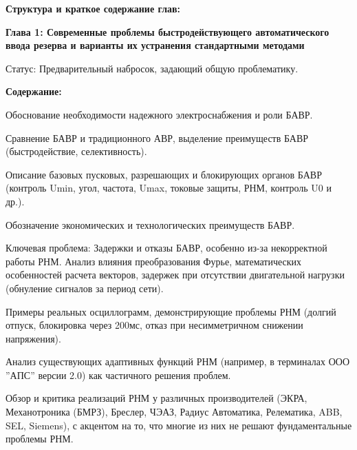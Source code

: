 \par\vspace{0.3cm}
\noindent\textbf{Структура и краткое содержание глав:}\par\vspace{0.2cm}
\noindent\textbf{Глава 1: Современные проблемы быстродействующего автоматического ввода резерва и варианты их устранения стандартными методами}\par\vspace{0.2cm}
Статус: Предварительный набросок, задающий общую проблематику.\par\vspace{0.2cm}
\noindent\textbf{Содержание:}\par\vspace{0.2cm}
Обоснование необходимости надежного электроснабжения и роли БАВР.\par\vspace{0.2cm}
Сравнение БАВР и традиционного АВР, выделение преимуществ БАВР (быстродействие, селективность).\par\vspace{0.2cm}
Описание базовых пусковых, разрешающих и блокирующих органов БАВР (контроль Umin, угол, частота, Umax, токовые защиты, РНМ, контроль U0 и др.).\par\vspace{0.2cm}
Обозначение экономических и технологических преимуществ БАВР.\par\vspace{0.2cm}
Ключевая проблема: Задержки и отказы БАВР, особенно из-за некорректной работы РНМ. Анализ влияния преобразования Фурье, математических особенностей расчета векторов, задержек при отсутствии двигательной нагрузки (обнуление сигналов за период сети).\par\vspace{0.2cm}
Примеры реальных осциллограмм, демонстрирующие проблемы РНМ (долгий отпуск, блокировка через 200мс, отказ при несимметричном снижении напряжения).\par\vspace{0.2cm}
Анализ существующих адаптивных функций РНМ (например, в терминалах ООО ''АПС'' версии 2.0) как частичного решения проблем.\par\vspace{0.2cm}
Обзор и критика реализаций РНМ у различных производителей (ЭКРА, Механотроника (БМРЗ), Бреслер, ЧЭАЗ, Радиус Автоматика, Релематика, ABB, SEL, Siemens), с акцентом на то, что многие из них не решают фундаментальные проблемы РНМ.\par\vspace{0.2cm}
